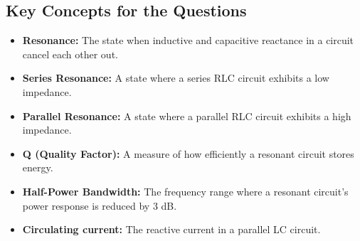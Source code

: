 \subsection*{Key Concepts for the Questions}
\begin{itemize}
    \item \textbf{Resonance:} The state when inductive and capacitive reactance in a circuit cancel each other out.
    \item \textbf{Series Resonance:} A state where a series RLC circuit exhibits a low impedance.
    \item \textbf{Parallel Resonance:} A state where a parallel RLC circuit exhibits a high impedance.
    \item \textbf{Q (Quality Factor):} A measure of how efficiently a resonant circuit stores energy.
    \item \textbf{Half-Power Bandwidth:} The frequency range where a resonant circuit's power response is reduced by 3 dB.
        \item  \textbf{Circulating current:} The reactive current in a parallel LC circuit.
\end{itemize}

